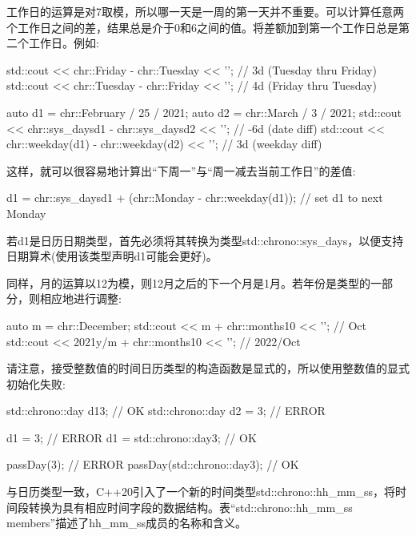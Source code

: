 工作日的运算是对7取模，所以哪一天是一周的第一天并不重要。可以计算任意两个工作日之间的差，结果总是介于0和6之间的值。将差额加到第一个工作日总是第二个工作日。例如:

\begin{cpp}
std::cout << chr::Friday - chr::Tuesday << '\n'; // 3d (Tuesday thru Friday)
std::cout << chr::Tuesday - chr::Friday << '\n'; // 4d (Friday thru Tuesday)

auto d1 = chr::February / 25 / 2021;
auto d2 = chr::March / 3 / 2021;
std::cout << chr::sys_days{d1} - chr::sys_days{d2} << '\n'; // -6d (date diff)
std::cout << chr::weekday(d1) - chr::weekday(d2) << '\n'; // 3d (weekday diff)
\end{cpp}

这样，就可以很容易地计算出“下周一”与“周一减去当前工作日”的差值:

\begin{cpp}
d1 = chr::sys_days{d1} + (chr::Monday - chr::weekday(d1)); // set d1 to next Monday
\end{cpp}

若d1是日历日期类型，首先必须将其转换为类型std::chrono::sys\_days，以便支持日期算术(使用该类型声明d1可能会更好)。

同样，月的运算以12为模，则12月之后的下一个月是1月。若年份是类型的一部分，则相应地进行调整:

\begin{cpp}
auto m = chr::December;
std::cout << m + chr::months{10} << '\n'; // Oct
std::cout << 2021y/m + chr::months{10} << '\n'; // 2022/Oct
\end{cpp}

请注意，接受整数值的时间日历类型的构造函数是显式的，所以使用整数值的显式初始化失败:

\begin{cpp}
std::chrono::day d1{3}; // OK
std::chrono::day d2 = 3; // ERROR

d1 = 3; // ERROR
d1 = std::chrono::day{3}; // OK

passDay(3); // ERROR
passDay(std::chrono::day{3}); // OK
\end{cpp}


与日历类型一致，C++20引入了一个新的时间类型std::chrono::hh\_mm\_ss，将时间段转换为具有相应时间字段的数据结构。表“std::chrono::hh\_mm\_ss members”描述了hh\_mm\_ss成员的名称和含义。

